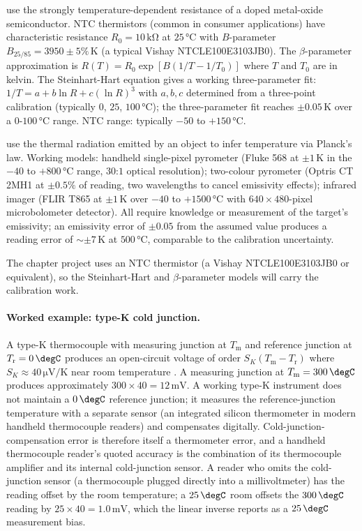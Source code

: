  use the strongly temperature-dependent
resistance of a doped metal-oxide semiconductor. NTC thermistors
(common in consumer applications) have characteristic
resistance $R_{0} = 10\,\si{\kilo\ohm}$ at $25\,\si{
\degreeCelsius}$ with $B$-parameter $B_{25/85} = 3950 \pm 5\%\,
\si{\kelvin}$ (a typical Vishay NTCLE100E3103JB0). The
$\beta$-parameter approximation is $R(T) = R_{0}\exp[B(1/T -
1/T_{0})]$ where $T$ and $T_{0}$ are in kelvin. The Steinhart-Hart
equation gives a working three-parameter fit:
$1/T = a + b\ln R + c(\ln R)^{3}$ with $a, b, c$ determined from
a three-point calibration (typically $0$, $25$, $100\,\si{
\degreeCelsius}$); the three-parameter fit reaches
$\pm 0.05\,\si{\kelvin}$ over a $0$-$100\,\si{\degreeCelsius}$
range. NTC range: typically $-50$ to $+150\,\si{\degreeCelsius}$.

 use the thermal
radiation emitted by an object to infer temperature via Planck's
law. Working models: handheld single-pixel pyrometer (Fluke 568
at $\pm 1\,\si{\kelvin}$ in the $-40$ to $+800\,\si{
\degreeCelsius}$ range, $30$:$1$ optical resolution); two-colour
pyrometer (Optris CT 2MH1 at $\pm 0.5\%$ of reading, two
wavelengths to cancel emissivity effects); infrared imager
(FLIR T865 at $\pm 1\,\si{\kelvin}$ over $-40$ to $+1500\,\si{
\degreeCelsius}$ with $640 \times 480$-pixel microbolometer
detector). All require knowledge or measurement of the target's
emissivity; an emissivity error of $\pm 0.05$ from the assumed
value produces a reading error of $\sim \pm 7\,\si{\kelvin}$ at
$500\,\si{\degreeCelsius}$, comparable to the calibration
uncertainty.

The chapter project uses an NTC thermistor (a Vishay
NTCLE100E3103JB0 or equivalent), so the Steinhart-Hart and
$\beta$-parameter models will carry the calibration work.

\paragraph{Worked example: type-K cold junction.} A type-K
thermocouple with measuring junction at $T_{\text{m}}$ and reference
junction at $T_{\text{r}} = 0 \,\degC$ produces an open-circuit
voltage of order $S_{K}(T_{\text{m}} - T_{\text{r}})$ where
$S_{K} \approx 40 \,\si{\micro\volt\per\kelvin}$ near room
temperature \cite{text:fraden2016}. A measuring junction at
$T_{\text{m}} = 300 \,\degC$ produces approximately
$300 \times 40 = 12 \,\si{\milli\volt}$. A working type-K instrument
does not maintain a $0 \,\degC$ reference junction; it measures the
reference-junction temperature with a separate sensor (an integrated
silicon thermometer in modern handheld thermocouple readers) and
compensates digitally. Cold-junction-compensation error is therefore
itself a thermometer error, and a handheld thermocouple reader's
quoted accuracy is the combination of its thermocouple amplifier and
its internal cold-junction sensor. A reader who omits the
cold-junction sensor (a thermocouple plugged directly into a
millivoltmeter) has the reading offset by the room temperature; a
$25 \,\degC$ room offsets the $300 \,\degC$ reading by
$25 \times 40 = 1.0 \,\si{\milli\volt}$, which the linear inverse
reports as a $25 \,\degC$ measurement bias.

